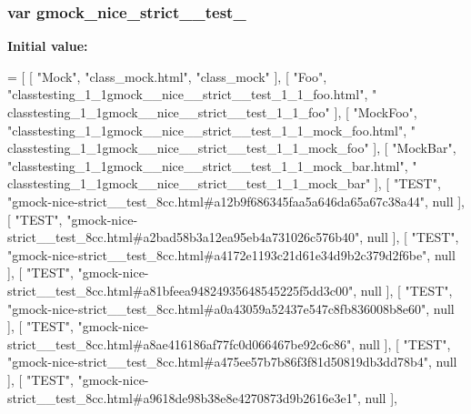 \subsubsection[{\texorpdfstring{gmock\+\_\+nice\+\_\+strict\+\_\+\+\_\+test\+\_\+8cc}{gmock_nice_strict__test_8cc}}]{\setlength{\rightskip}{0pt plus 5cm}var gmock\+\_\+nice\+\_\+strict\+\_\+\+\_\+test\+\_}\hypertarget{gmock-nice-strict____test__8cc_8js_a38fd3e6f0b2bb500f9fa3afcbe35aa5d}{}\label{gmock-nice-strict____test__8cc_8js_a38fd3e6f0b2bb500f9fa3afcbe35aa5d}
{\bfseries Initial value\+:}
\begin{DoxyCode}
=
[
    [ \textcolor{stringliteral}{"Mock"}, \textcolor{stringliteral}{"class\_mock.html"}, \textcolor{stringliteral}{"class\_mock"} ],
    [ \textcolor{stringliteral}{"Foo"}, \textcolor{stringliteral}{"classtesting\_1\_1gmock\_\_nice\_\_strict\_\_test\_1\_1\_foo.html"}, \textcolor{stringliteral}{"
      classtesting\_1\_1gmock\_\_nice\_\_strict\_\_test\_1\_1\_foo"} ],
    [ \textcolor{stringliteral}{"MockFoo"}, \textcolor{stringliteral}{"classtesting\_1\_1gmock\_\_nice\_\_strict\_\_test\_1\_1\_mock\_foo.html"}, \textcolor{stringliteral}{"
      classtesting\_1\_1gmock\_\_nice\_\_strict\_\_test\_1\_1\_mock\_foo"} ],
    [ \textcolor{stringliteral}{"MockBar"}, \textcolor{stringliteral}{"classtesting\_1\_1gmock\_\_nice\_\_strict\_\_test\_1\_1\_mock\_bar.html"}, \textcolor{stringliteral}{"
      classtesting\_1\_1gmock\_\_nice\_\_strict\_\_test\_1\_1\_mock\_bar"} ],
    [ \textcolor{stringliteral}{"TEST"}, \textcolor{stringliteral}{"gmock-nice-strict\_\_test\_8cc.html#a12b9f686345faa5a646da65a67c38a44"}, null ],
    [ \textcolor{stringliteral}{"TEST"}, \textcolor{stringliteral}{"gmock-nice-strict\_\_test\_8cc.html#a2bad58b3a12ea95eb4a731026c576b40"}, null ],
    [ \textcolor{stringliteral}{"TEST"}, \textcolor{stringliteral}{"gmock-nice-strict\_\_test\_8cc.html#a4172e1193c21d61e34d9b2c379d2f6be"}, null ],
    [ \textcolor{stringliteral}{"TEST"}, \textcolor{stringliteral}{"gmock-nice-strict\_\_test\_8cc.html#a81bfeea94824935648545225f5dd3c00"}, null ],
    [ \textcolor{stringliteral}{"TEST"}, \textcolor{stringliteral}{"gmock-nice-strict\_\_test\_8cc.html#a0a43059a52437e547c8fb836008b8e60"}, null ],
    [ \textcolor{stringliteral}{"TEST"}, \textcolor{stringliteral}{"gmock-nice-strict\_\_test\_8cc.html#a8ae416186af77fc0d066467be92c6c86"}, null ],
    [ \textcolor{stringliteral}{"TEST"}, \textcolor{stringliteral}{"gmock-nice-strict\_\_test\_8cc.html#a475ee57b7b86f3f81d50819db3dd78b4"}, null ],
    [ \textcolor{stringliteral}{"TEST"}, \textcolor{stringliteral}{"gmock-nice-strict\_\_test\_8cc.html#a9618de98b38e8e4270873d9b2616e3e1"}, null ],

\end{DoxyCode}
